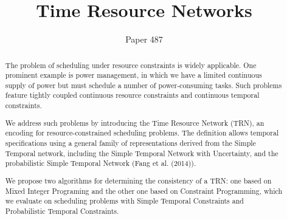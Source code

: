 \documentclass{article}
\title{Time Resource Networks}
\author{Paper 487}
\begin{document}
\maketitle

\begin{abstract}
  The problem of scheduling under resource constraints is widely applicable. One prominent example is power management, in which we have a limited continuous supply of power but must schedule a number of power-consuming tasks. Such problems feature tightly coupled continuous resource constraints and continuous temporal constraints.

  We address such problems by introducing the Time Resource Network (TRN), an encoding for resource-constrained scheduling problems. The definition allows temporal specifications using a general family of representations derived from the Simple Temporal network, including the Simple Temporal Network with Uncertainty, and the probabilistic Simple Temporal Network (Fang et al. (2014)).

  We propose two algorithms for determining the consistency of a TRN: one based on Mixed Integer Programing and the other one based on Constraint Programming, which we evaluate on scheduling problems with Simple Temporal Constraints and Probabilistic Temporal Constraints.
\end{abstract}












%
\end{document}
